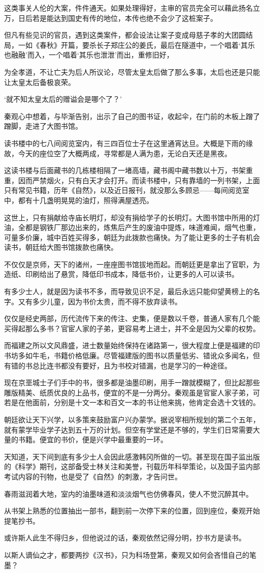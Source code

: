 这类事关人伦的大案，件件通天。如果处理得好，主审的官员完全可以藉此扬名立万，日后若是能达到国史有传的地位，本传也绝不会少了这桩案子。

但凡有些见识的官员，遇到这类案件，都会设法让案子变成母慈子孝的大团圆结局，一如《春秋》开篇，要杀长子郑庄公的姜氏，最后在隧道中，一个唱着‘其乐也融融’而入，一个唱着‘其乐也泄泄’而出，重修旧好，

为全孝道，不让亡夫为后人所议论，尽管太皇太后做了那么多事，太后也还是只能让太皇太后备极哀荣。

‘就不知太皇太后的赠谥会是哪个了？’

秦观心中想着，与毕渐告别，出示了自己的图书证，收起伞，在门前的木板上蹭了蹭脚，走进了大图书馆。

读书楼中的七八间阅览室内，有三四百位士子在这里通宵达旦。大概是下雨的缘故，今天的座位空了大概两成，寻常都是人满为患，无论白天还是黑夜。

这读书楼与后面藏书的几栋楼相隔了一堵高墙，藏书阁中藏书数以十万，书架重重，因而严禁烟火，只有白天才会打开。而读书楼中，只有靠墙的一列书架，上面只有常见书籍，历年《自然》，以及近日报刊，就没那么多顾忌——每间阅览室中，都有十几盏明晃晃的油灯，照得满屋透亮。

这世上，只有捐献给寺庙长明灯，却没有捐给学子的长明灯。大图书馆中所用的灯油，全都是钢铁厂那边出来的，炼焦后产生的废油中提炼，味道难闻，烟气也重，可量多价廉，城中百姓买得多，朝廷为此拨款也痛快。为了能让更多的士子有机会读书，朝廷给大图书馆拨款也痛快。

不仅仅是京师，天下的诸州，一座座图书馆拔地而起。而朝廷更是拿出了官职，为造纸、印刷给出了悬赏，降低印书成本，降低书价，让更多的人可以读书。

有多少士人，就是因为读书不多，而导致见识不足，最后永远只能仰望黄榜上的名字。又有多少儿童，因为书价太贵，而不得不放弃读书。

仅仅是经史两部，历代流传下来的传注、史集，便是数以千卷，普通人家有几个能买得起那么多书？官宦人家的子弟，更容易考上进士，并不全是因为父辈的权势。

而福建之所以文风鼎盛，进士数量始终保持在诸路第一，很大程度上便是福建的印书坊多如牛毛，书籍价格低廉。尽管福建版的图书以质量低劣、错讹众多闻名，但有错的书总比连书都没有要好，且为书校对错漏，也是学习的一种途径。

现在京垩城士子们手中的书，很多都是油墨印刷，用手一蹭就模糊了，但比起那些雕版精美、纸质优良的上品书，便宜的不是一分两分。秦观虽是官宦人家子弟，可若是在他面前，分别是十文一本和百文一本的书让他来挑，他肯定会选十文钱的。

朝廷欲让天下兴学，以多策来鼓励富户兴办蒙学。据说宰相所规划的第二个五年，就有蒙学毕业学子达到五十万的计划。但空有学堂还是不够的，学生们日常需要大量的书籍。便宜的书价，便是兴学中最重要的一环。

天知道，天下间到底有多少士人会因此感激韩冈所做的一切。甚至现在国子监出版的《科学》期刊，这部备受士林关注和美誉，刊载历年科举策论，以及国子监内部考试内容的刊物，也是受了《自然》的刺激，才告问世。

春雨滋润着大地，室内的油墨味道和淡淡烟气也仿佛春风，使人不觉沉醉其中。

从书架上熟悉的位置抽出一部书，翻到前一次停下来的位置，回到座位，秦观开始提笔抄书。

或许斯人此生不得归乡，但他说过的话，秦观依然记得分明，抄书方是读书。

以斯人谪仙之才，都要两抄《汉书》，只为科场登第，秦观又如何会吝惜自己的笔墨？


